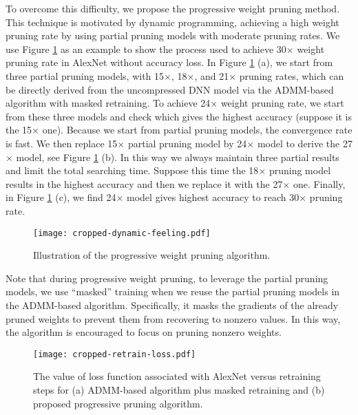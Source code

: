 \documentclass{article} %
\begin{document}
To overcome this difficulty, we propose the progressive weight pruning method. 
This technique is motivated by dynamic programming, achieving a high weight pruning rate by using partial pruning models with moderate pruning rates. 
We use Figure \ref{fig:progressive} as an example to show the process used to achieve 30$\times$ weight pruning rate in AlexNet without accuracy loss. 
In Figure \ref{fig:progressive} (a), we start from three partial pruning models, with 15$\times$, 18$\times$, and 21$\times$ pruning rates, which can be directly derived from the uncompressed DNN model via the ADMM-based algorithm with masked retraining. 
To achieve 24$\times$ weight pruning rate, we start from these three models and check which gives the highest accuracy (suppose it is the 15$\times$ one). Because we start from partial pruning models, the convergence rate is fast. 
We then replace 15$\times$ partial pruning model by 24$\times$ model to derive the 27$\times$ model, see Figure \ref{fig:progressive} (b).
In this way we always maintain three partial results and limit the total searching time.
Suppose this time the 18$\times$ pruning model results in the highest accuracy and then we replace it with the 27$\times$ one.
Finally, in Figure \ref{fig:progressive} (c), we find 24$\times$ model gives highest accuracy to reach 30$\times$ pruning rate.



\begin{figure}[h]
\begin{center}
\texttt{[image: cropped-dynamic-feeling.pdf]}
\end{center}
\caption{Illustration of the progressive weight pruning algorithm.}
\label{fig:progressive}
\end{figure}

Note that during progressive weight pruning, to leverage the partial pruning models, we use ``masked'' training when we reuse the partial pruning models in the ADMM-based algorithm.
Specifically, it masks the gradients of the already pruned weights to prevent them from recovering to nonzero values.
In this way, the algorithm is encouraged to focus on pruning nonzero weights.




\begin{figure}[h]
\begin{center}
\texttt{[image: cropped-retrain-loss.pdf]}
\end{center}
\caption{The value of loss function associated with AlexNet versus retraining steps for
(a) ADMM-based algorithm plus masked retraining and (b) proposed progressive pruning algorithm. }\label{fig:comparison}
\end{figure} 
\end{document}
